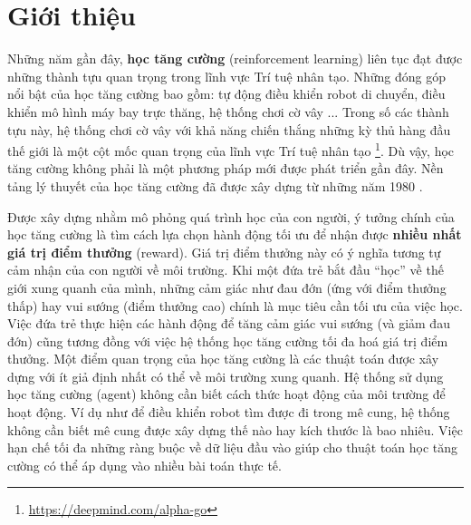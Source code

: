 \chapter{Giới thiệu}

\ifpdf
\graphicspath{{Chapter1/Chapter1Figs/PNG/}{Chapter1/Chapter1Figs/PDF/}{Chapter1/Chapter1Figs/}}
\else
\graphicspath{{Chapter1/Chapter1Figs/EPS/}{Chapter1/Chapter1Figs/}}
\fi

Những năm gần đây, \textbf{học tăng cường} (reinforcement learning) liên tục đạt được những thành tựu quan trọng trong lĩnh vực Trí tuệ nhân tạo. 
Những đóng góp nổi bật của học tăng cường bao gồm: tự động điều khiển robot di chuyển, điều khiển mô hình máy bay trực thăng, hệ thống chơi cờ vây ... 
Trong số các thành tựu này, hệ thống chơi cờ vây với khả năng chiến thắng những kỳ thủ hàng đầu thế giới là một cột mốc quan trọng của lĩnh vực Trí tuệ nhân tạo \footnote{\url{https://deepmind.com/alpha-go}}. 
Dù vậy, học tăng cường không phải là một phương pháp mới được phát triển gần đây.
Nền tảng lý thuyết của học tăng cường đã được xây dựng từ những năm 1980 \cite{sutton1998introduction}.

Được xây dựng nhằm mô phỏng quá trình học của con người, ý tưởng chính của học tăng cường là tìm cách lựa chọn hành động tối ưu để nhận được \textbf{nhiều nhất giá trị điểm thưởng} (reward). 
Giá trị điểm thưởng này có ý nghĩa tương tự cảm nhận của con người về môi trường. 
Khi một đứa trẻ bắt đầu ``học'' về thế giới xung quanh của mình, những cảm giác như đau đớn (ứng với điểm thưởng thấp) hay vui sướng (điểm thưởng cao) chính là mục tiêu cần tối ưu của việc học. 
Việc đứa trẻ thực hiện các hành động để tăng cảm giác vui sướng (và giảm đau đớn) cũng tương đồng với việc hệ thống học tăng cường tối đa hoá giá trị điểm thưởng.
Một điểm quan trọng của học tăng cường là các thuật toán được xây dựng với ít giả định nhất có thể về môi trường xung quanh.
Hệ thống sử dụng học tăng cường (agent) không cần biết cách thức hoạt động của môi trường để hoạt động. 
Ví dụ như để điều khiển robot tìm được đi trong mê cung, hệ thống không cần biết mê cung được xây dựng thế nào hay kích thước là bao nhiêu. 
Việc hạn chế tối đa những ràng buộc về dữ liệu đầu vào giúp cho thuật toán học tăng cường có thể áp dụng vào nhiều bài toán thực tế.

